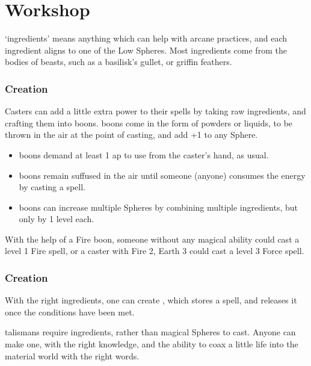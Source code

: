 \section{ Workshop}

\begin{multicols}{2}

\noindent
`\Glspl{ingredient}' means anything which can help with arcane practices, and each \gls{ingredient} aligns to one of the Low Spheres.
Most \glspl{ingredient} come from the bodies of beasts, such as a basilisk's gullet, or griffin feathers.

\subsubsection{ Creation}

Casters can add a little extra power to their spells by taking raw \glspl{ingredient}, and crafting them into \glspl{boon}.
\Glspl{boon} come in the form of powders or liquids, to be thrown in the air at the point of casting, and add +1 to any Sphere.

\begin{itemize}
  \item
  \Glspl{boon} demand at least 1 \gls{ap} to use from the caster's hand, as usual.
  \item
  \Glspl{boon} remain suffused in the air until someone (anyone) consumes the energy by casting a spell.
  \item
  \Glspl{boon} can increase multiple Spheres by combining multiple \glspl{ingredient}, but only by 1 level each.
\end{itemize}

\noindent
With the help of a Fire \gls{boon}, someone without any magical ability could cast a level 1 Fire spell, or a caster with Fire 2, Earth 3 could cast a level 3 Force spell.

\subsubsection{ Creation}

With the right \glspl{ingredient}, one can create , which stores a spell, and releases it once the conditions have been met.

\Glspl{talisman} require \glspl{ingredient}, rather than magical Spheres to cast.
Anyone can make one, with the right knowledge, and the ability to coax a little life into the material world with the right words.


\end{multicols}
